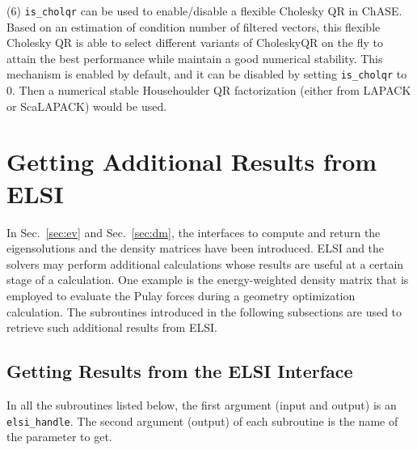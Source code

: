 \documentclass{report}
\begin{document}
(6)  \texttt{is\_cholqr} can be used to enable/disable a flexible Cholesky QR in ChASE.
Based on an estimation of condition number of filtered vectors, this flexible Cholesky QR is
able to select different variants of CholeskyQR on the fly to attain the best performance while
maintain a good numerical stability. This mechanism is enabled by default, and it can be
disabled by setting  \texttt{is\_cholqr} to $0$. Then a numerical stable Househoulder QR
factorization (either from LAPACK or ScaLAPACK) would be used.

\section{Getting Additional Results from ELSI}
\label{sec:getter}
In Sec.~\ref{sec:ev} and Sec.~\ref{sec:dm}, the interfaces to compute and return the eigensolutions and the density matrices have been introduced. ELSI and the solvers may perform additional calculations whose results are useful at a certain stage of a calculation. One example is the energy-weighted density matrix that is employed to evaluate the Pulay forces during a geometry optimization calculation. The subroutines introduced in the following subsections are used to retrieve such additional results from ELSI.

\subsection{Getting Results from the ELSI Interface}
\label{subsec:getter_elsi}
In all the subroutines listed below, the first argument (input and output) is an \texttt{elsi\_handle}. The second argument (output) of each subroutine is the name of the parameter to get.
\end{document}
